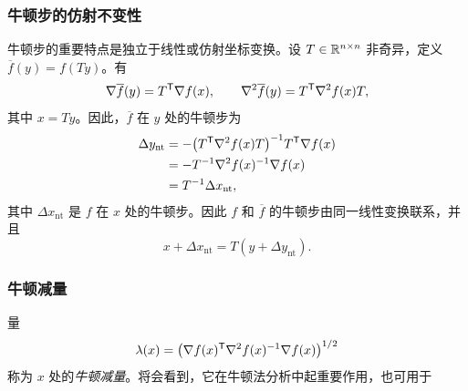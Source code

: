 \subsubsection*{牛顿步的仿射不变性}
牛顿步的重要特点是独立于线性或仿射坐标变换。设 $T\in\mathbb R^{n\times n}$ 非奇异，定义 $\overline f(y)=f(Ty)$。有
\[
\nabla\overline f(y)=T^\mathsf T\nabla f(x),\qquad
\nabla^2\overline f(y)=T^\mathsf T\nabla^2f(x)T,
\]
其中 $x=Ty$。因此，$\overline f$ 在 $y$ 处的牛顿步为
\[
\begin{aligned}
\Delta y_{\mathrm{nt}}
&=-\bigl(T^\mathsf T\nabla^2f(x)T\bigr)^{-1}T^\mathsf T\nabla f(x)\\
&=-T^{-1}\nabla^2f(x)^{-1}\nabla f(x)\\
&=T^{-1}\Delta x_{\mathrm{nt}},
\end{aligned}
\]
其中 $\Delta x_{\mathrm{nt}}$ 是 $f$ 在 $x$ 处的牛顿步。因此 $f$ 和 $\overline f$ 的牛顿步由同一线性变换联系，并且
\[
x+\Delta x_{\mathrm{nt}}=T(y+\Delta y_{\mathrm{nt}}).
\]

\subsubsection*{牛顿减量}
量
\[
\lambda(x)=\bigl(\nabla f(x)^\mathsf T\nabla^2f(x)^{-1}\nabla f(x)\bigr)^{1/2}
\]
称为 $x$ 处的\emph{牛顿减量}。将会看到，它在牛顿法分析中起重要作用，也可用于
